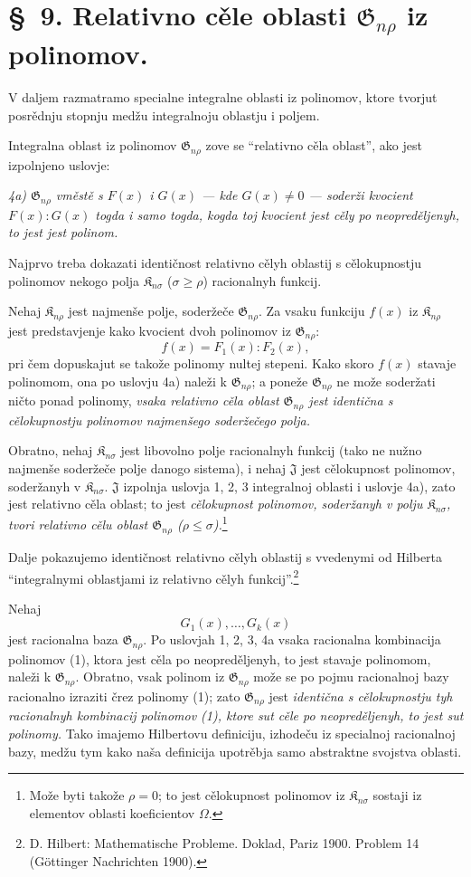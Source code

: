 \documentclass[11pt]{article}
\providecommand{\Kfield}{\mathfrak{K}}
\providecommand{\Jdom}{\mathfrak{J}}
\providecommand{\Gdom}{\mathfrak{G}}
\begin{document}
\section*{\S\ 9. Relativno cěle oblasti $\Gdom_{n\rho}$ iz polinomov.}

V daljem razmatramo specialne integralne oblasti iz polinomov, ktore tvorjut posrědnju stopnju medžu integralnoju oblastju i poljem.

Integralna oblast iz polinomov $\Gdom_{n\rho}$ zove se ``relativno cěla oblast'', ako jest izpolnjeno uslovje:

{\itshape 4a) $\Gdom_{n\rho}$ vměstě s $F(x)$ i $G(x)$ --- kde $G(x)\ne0$ --- soderži kvocient $F(x):G(x)$ togda i samo togda, kogda toj kvocient jest cěly po neopreděljenyh, to jest jest polinom.}

Najprvo treba dokazati identičnost relativno cělyh oblastij s cělokupnostju polinomov nekogo polja $\Kfield_{n\sigma}$ ($\sigma\ge \rho$) racionalnyh funkcij.

Nehaj $\Kfield_{n\rho}$ jest najmenše polje, soderžeče $\Gdom_{n\rho}$. Za vsaku funkciju $f(x)$ iz $\Kfield_{n\rho}$ jest predstavjenje kako kvocient dvoh polinomov iz $\Gdom_{n\rho}$:
\[
  f(x)=F_1(x):F_2(x),
\]
pri čem dopuskajut se takože polinomy nultej stepeni. Kako skoro $f(x)$ stavaje polinomom, ona po uslovju 4a) naleži k $\Gdom_{n\rho}$; a poneže $\Gdom_{n\rho}$ ne može soderžati ničto ponad polinomy, \emph{vsaka relativno cěla oblast $\Gdom_{n\rho}$ jest identična s cělokupnostju polinomov najmenšego soderžečego polja.}

Obratno, nehaj $\Kfield_{n\sigma}$ jest libovolno polje racionalnyh funkcij (tako ne nužno najmenše soderžeče polje danogo sistema), i nehaj $\Jdom$ jest cělokupnost polinomov, soderžanyh v $\Kfield_{n\sigma}$. $\Jdom$ izpolnja uslovja 1, 2, 3 integralnoj oblasti i uslovje 4a), zato jest relativno cěla oblast; to jest \emph{cělokupnost polinomov, soderžanyh v polju $\Kfield_{n\sigma}$, tvori relativno cělu oblast $\Gdom_{n\rho}$ ($\rho\le\sigma$).}\footnote{Može byti takože $\rho=0$; to jest cělokupnost polinomov iz $\Kfield_{n\sigma}$ sostaji iz elementov oblasti koeficientov $\Omega$.}

Dalje pokazujemo identičnost relativno cělyh oblastij s vvedenymi od Hilberta ``integralnymi oblastjami iz relativno cělyh funkcij''.\footnote{D. Hilbert: Mathematische Probleme. Doklad, Pariz 1900. Problem 14 (Göttinger Nachrichten 1900).}

Nehaj
\begin{equation}
  G_1(x),\ldots,G_k(x)
\tag{1}
\end{equation}
jest racionalna baza $\Gdom_{n\rho}$. Po uslovjah 1, 2, 3, 4a vsaka racionalna kombinacija polinomov (1), ktora jest cěla po neopreděljenyh, to jest stavaje polinomom, naleži k $\Gdom_{n\rho}$. Obratno, vsak polinom iz $\Gdom_{n\rho}$ može se po pojmu racionalnoj bazy racionalno izraziti črez polinomy (1); zato $\Gdom_{n\rho}$ jest \emph{identična s cělokupnostju tyh racionalnyh kombinacij polinomov (1), ktore sut cěle po neopreděljenyh, to jest sut polinomy.} Tako imajemo Hilbertovu definiciju, izhodeču iz specialnoj racionalnoj bazy, medžu tym kako naša definicija upotrěbja samo abstraktne svojstva oblasti.
\end{document}
